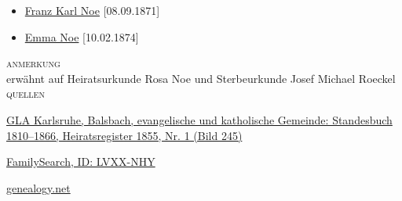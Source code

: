 \begin{person}[
    surname = {Noe},
    givenname = {Franz},
    suffix = {1824--1897},
    label = {@I504@}
    ]
\begin{itemize}
\item \hyperref[@I1748@]{Franz Karl Noe} [08.09.1871]
\item \hyperref[@I1749@]{Emma Noe} [10.02.1874]
\end{itemize}
\medbreak
\textsc{anmerkung}\\
erwähnt auf Heiratsurkunde Rosa Noe und Sterbeurkunde Josef Michael Roeckel
\medbreak
\textsc{{quellen}}
\begin{enumerate}[label={[\arabic*]}]
\item \href{http://www.landesarchiv-bw.de/plink/?f=4-1120207-245}{GLA Karlsruhe, Balsbach, evangelische und katholische Gemeinde: Standesbuch 1810–1866, Heiratsregister 1855, Nr. 1 (Bild 245)}
\item \href{https://www.familysearch.org/tree/person/details/LVXX-NHY}{FamilySearch, ID: LVXX-NHY}
\item \href{http://gedbas.genealogy.net/person/show/1172956702}{genealogy.net}
\end{enumerate}

\end{person}

